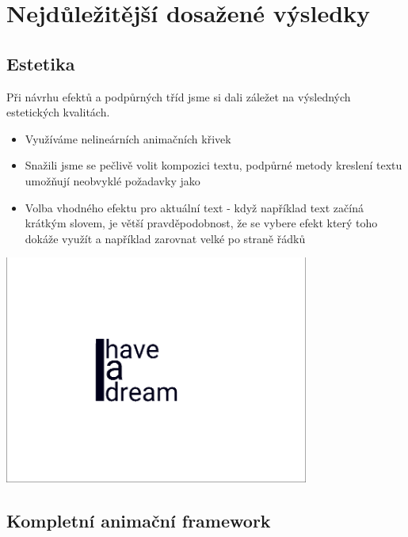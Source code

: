 \documentclass[12pt,a4paper,titlepage,final]{report}
\begin{document}
\chapter{Nejdůležitější dosažené výsledky}

\section{Estetika}

Při návrhu efektů a podpůrných tříd jsme si dali záležet na výsledných estetických kvalitách.

\begin{itemize}
	\item Využíváme nelineárních animačních křivek
    \item Snažili jsme se pečlivě volit kompozici textu, podpůrné metody kreslení textu umožňují neobvyklé požadavky jako 
    \item Volba vhodného efektu pro aktuální text - když například text začíná krátkým slovem, je větší pravděpodobnost, že se vybere efekt který toho dokáže využít a například zarovnat velké  po straně řádků 
\end{itemize}

\begin{center}
	\captionsetup{type=figure}
		\includegraphics[width=10cm]{images/dream.png}
\end{center}

\section{Kompletní animační framework}
\end{document}
